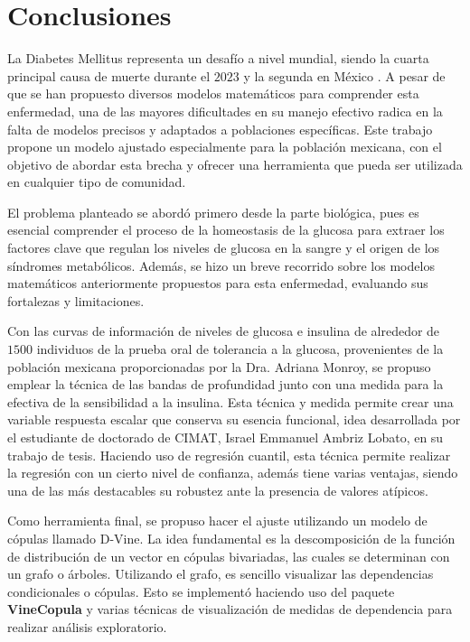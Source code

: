 \chapter{Conclusiones}

La Diabetes Mellitus representa un desafío a nivel mundial, siendo la cuarta principal causa de muerte durante el $2023$ y la segunda en México \cite{INEGI}. A pesar de que se han propuesto diversos modelos matemáticos para comprender esta enfermedad, una de las mayores dificultades en su manejo efectivo radica en la falta de modelos precisos y adaptados a poblaciones específicas. Este trabajo propone un modelo ajustado especialmente para la población mexicana, con el objetivo de abordar esta brecha y ofrecer una herramienta que pueda ser utilizada en cualquier tipo de comunidad.

El problema planteado se abordó primero desde la parte biológica, pues es esencial comprender el proceso de la homeostasis de la glucosa para extraer los factores clave que regulan los niveles de glucosa en la sangre y el origen de los síndromes metabólicos. Además, se hizo un breve recorrido sobre los modelos matemáticos anteriormente propuestos para esta enfermedad, evaluando sus fortalezas y limitaciones.

Con las curvas de información de niveles de glucosa e insulina de alrededor de $1500$ individuos de la prueba oral de tolerancia a la glucosa, provenientes de la población mexicana proporcionadas por la Dra. Adriana Monroy, se propuso emplear la técnica de las bandas de profundidad junto con una medida para la efectiva de la sensibilidad a la insulina. Esta técnica y medida permite crear una variable respuesta escalar que conserva su esencia funcional, idea desarrollada por el estudiante de doctorado de CIMAT, Israel Emmanuel Ambriz Lobato, en su trabajo de tesis. Haciendo uso de regresión cuantil, esta técnica permite realizar la regresión con un cierto nivel de confianza, además tiene varias ventajas, siendo una de las más destacables su robustez ante la presencia de valores atípicos.

Como herramienta final, se propuso hacer el ajuste utilizando un modelo de cópulas llamado D-Vine. La idea fundamental es la descomposición de la función de distribución de un vector en cópulas bivariadas, las cuales se determinan con un grafo o árboles. Utilizando el grafo, es sencillo visualizar las dependencias condicionales o cópulas. Esto se implementó haciendo uso del paquete \textbf{VineCopula} y varias técnicas de visualización de medidas de dependencia para realizar análisis exploratorio.

